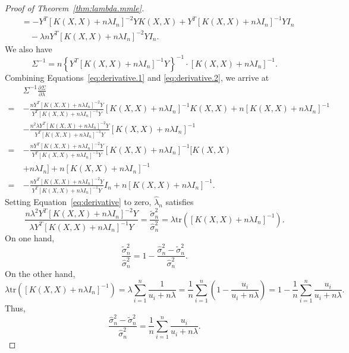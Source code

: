\documentclass[12pt]{article}
\newcommand{\tr}{\mathrm{tr}}
\theoremstyle{plain}
\theoremstyle{nonitalicremark}
\begin{document}
\begin{appendices}
\begin{proof}[Proof of Theorem~\ref{thm:lambda.mmle}]
\begin{align}
&= -Y^T [K(X,X)+n\lambda I_n]^{-2}Y K(X,X)+Y^T[K(X,X)+n\lambda I_n]^{-1}YI_n \\
\label{eq:derivative.1}&\quad -\lambda nY^T [K(X,X)+n\lambda I_n]^{-2}YI_n.
\end{align}
We also have
\begin{equation}\label{eq:derivative.2}
\Sigma^{-1}=n \left\{Y^T[K(X,X)+n\lambda I_n]^{-1}Y\right\}^{-1}\cdot[K(X,X)+n\lambda I_n]^{-1}.
\end{equation}
Combining Equations~\eqref{eq:derivative.1} and \eqref{eq:derivative.2}, we arrive at
\begin{align}
&\Sigma^{-1}\frac{\partial \Sigma}{\partial \lambda}\\
=\ & -\frac{nY^T [K(X,X)+n\lambda I_n]^{-2}Y}{Y^T[K(X,X)+n\lambda I_n]^{-1}Y} [K(X,X)+n\lambda I_n]^{-1}K(X,X)+n[K(X,X)+n\lambda I_n]^{-1}\\
&-\frac{n^2\lambda Y^T [K(X,X)+n\lambda I_n]^{-2}Y}{Y^T[K(X,X)+n\lambda I_n]^{-1}Y} [K(X,X)+n\lambda I_n]^{-1}\\
=\ &-\frac{nY^T [K(X,X)+n\lambda I_n]^{-2}Y}{Y^T[K(X,X)+n\lambda I_n]^{-1}Y} [K(X,X)+n\lambda I_n]^{-1}[K(X,X)\\
&+n\lambda I_n]+n[K(X,X)+n\lambda I_n]^{-1}\\
=\ &-\frac{nY^T [K(X,X)+n\lambda I_n]^{-2}Y}{Y^T[K(X,X)+n\lambda I_n]^{-1}Y}I_n +n[K(X,X)+n\lambda I_n]^{-1}.
\end{align}
Setting Equation~\eqref{eq:derivative} to zero, $\hat\lambda_n$ satisfies
\begin{equation}\label{eq:constraint}
\frac{n\lambda^2Y^T [K(X,X)+n\lambda I_n]^{-2}Y}{\lambda Y^T[K(X,X)+n\lambda I_n]^{-1}Y} =  \frac{\tilde\sigma_n^2}{\hat\sigma_n^2} = \lambda\tr([K(X,X)+n\lambda I_n]^{-1}).
\end{equation}
On one hand,
\begin{equation}
\frac{\tilde\sigma_n^2}{\hat\sigma_n^2} = 1 - \frac{\hat\sigma_n^2-\tilde\sigma_n^2}{\hat\sigma_n^2}.
\end{equation}
On the other hand,
\begin{equation}
\lambda\tr([K(X,X)+n\lambda I_n]^{-1}) = \lambda \sum_{i=1}^n \frac{1}{u_i + n\lambda} = \frac{1}{n}\sum_{i=1}^n \left(1-\frac{u_i}{u_i + n\lambda}\right) = 1-\frac{1}{n}\sum_{i=1}^n \frac{u_i}{u_i + n\lambda}.
\end{equation}
Thus,
\begin{equation}\label{eq:MMLE}
\frac{\hat\sigma_n^2-\tilde\sigma_n^2}{\hat\sigma_n^2} = \frac{1}{n}\sum_{i=1}^n \frac{u_i}{u_i + n\lambda}.

\end{equation}
\end{proof}
\end{appendices}
\end{document}
